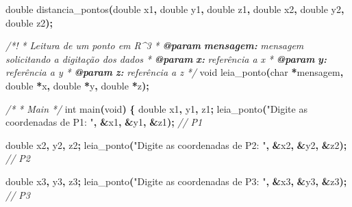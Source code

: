 \documentclass[
  11pt,
  a4paper,
]{scrbook}
\newenvironment{Shaded}{\begin{snugshade}}{\end{snugshade}}
\newcommand{\AnnotationTok}[1]{\textcolor[rgb]{0.56,0.35,0.01}{\textbf{\textit{#1}}}}
\newcommand{\CommentTok}[1]{\textcolor[rgb]{0.56,0.35,0.01}{\textit{#1}}}
\newcommand{\CommentVarTok}[1]{\textcolor[rgb]{0.56,0.35,0.01}{\textbf{\textit{#1}}}}
\newcommand{\DataTypeTok}[1]{\textcolor[rgb]{0.13,0.29,0.53}{#1}}
\newcommand{\NormalTok}[1]{#1}
\newcommand{\OperatorTok}[1]{\textcolor[rgb]{0.81,0.36,0.00}{\textbf{#1}}}
\newcommand{\StringTok}[1]{\textcolor[rgb]{0.31,0.60,0.02}{#1}}
\begin{document}
\begin{Shaded}
\begin{Highlighting}[]
\DataTypeTok{double}\NormalTok{ distancia\_pontos}\OperatorTok{(}\DataTypeTok{double}\NormalTok{ x1}\OperatorTok{,} \DataTypeTok{double}\NormalTok{ y1}\OperatorTok{,} \DataTypeTok{double}\NormalTok{ z1}\OperatorTok{,}
                        \DataTypeTok{double}\NormalTok{ x2}\OperatorTok{,} \DataTypeTok{double}\NormalTok{ y2}\OperatorTok{,} \DataTypeTok{double}\NormalTok{ z2}\OperatorTok{);}

\CommentTok{/*!}
\CommentTok{ * Leitura de um ponto em R\^{}3}
\CommentTok{ * }\AnnotationTok{@param}\CommentTok{ }\CommentVarTok{mensagem:}\CommentTok{ mensagem solicitando a digitação dos dados}
\CommentTok{ * }\AnnotationTok{@param}\CommentTok{ }\CommentVarTok{x:}\CommentTok{ referência a x}
\CommentTok{ * }\AnnotationTok{@param}\CommentTok{ }\CommentVarTok{y:}\CommentTok{ referência a y}
\CommentTok{ * }\AnnotationTok{@param}\CommentTok{ }\CommentVarTok{z:}\CommentTok{ referência a z}
\CommentTok{ */}
\DataTypeTok{void}\NormalTok{ leia\_ponto}\OperatorTok{(}\DataTypeTok{char} \OperatorTok{*}\NormalTok{mensagem}\OperatorTok{,} \DataTypeTok{double} \OperatorTok{*}\NormalTok{x}\OperatorTok{,} \DataTypeTok{double} \OperatorTok{*}\NormalTok{y}\OperatorTok{,} \DataTypeTok{double} \OperatorTok{*}\NormalTok{z}\OperatorTok{);}

\CommentTok{/*}
\CommentTok{ * Main}
\CommentTok{ */}
\DataTypeTok{int}\NormalTok{ main}\OperatorTok{(}\DataTypeTok{void}\OperatorTok{)} \OperatorTok{\{}
    \DataTypeTok{double}\NormalTok{ x1}\OperatorTok{,}\NormalTok{ y1}\OperatorTok{,}\NormalTok{ z1}\OperatorTok{;}
\NormalTok{    leia\_ponto}\OperatorTok{(}\StringTok{"Digite as coordenadas de P1: "}\OperatorTok{,} \OperatorTok{\&}\NormalTok{x1}\OperatorTok{,} \OperatorTok{\&}\NormalTok{y1}\OperatorTok{,} \OperatorTok{\&}\NormalTok{z1}\OperatorTok{);}  \CommentTok{// P1}

    \DataTypeTok{double}\NormalTok{ x2}\OperatorTok{,}\NormalTok{ y2}\OperatorTok{,}\NormalTok{ z2}\OperatorTok{;}
\NormalTok{    leia\_ponto}\OperatorTok{(}\StringTok{"Digite as coordenadas de P2: "}\OperatorTok{,} \OperatorTok{\&}\NormalTok{x2}\OperatorTok{,} \OperatorTok{\&}\NormalTok{y2}\OperatorTok{,} \OperatorTok{\&}\NormalTok{z2}\OperatorTok{);}  \CommentTok{// P2}

    \DataTypeTok{double}\NormalTok{ x3}\OperatorTok{,}\NormalTok{ y3}\OperatorTok{,}\NormalTok{ z3}\OperatorTok{;}
\NormalTok{    leia\_ponto}\OperatorTok{(}\StringTok{"Digite as coordenadas de P3: "}\OperatorTok{,} \OperatorTok{\&}\NormalTok{x3}\OperatorTok{,} \OperatorTok{\&}\NormalTok{y3}\OperatorTok{,} \OperatorTok{\&}\NormalTok{z3}\OperatorTok{);}  \CommentTok{// P3}


\end{Highlighting}
\end{Shaded}
\end{document}
